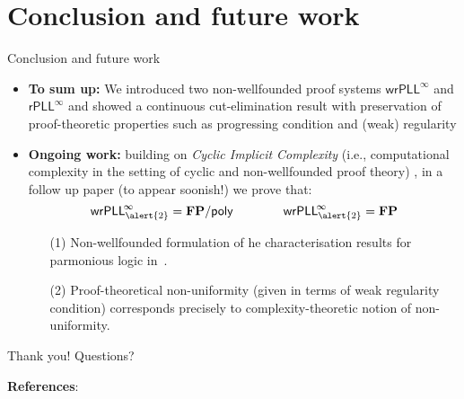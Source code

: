 \documentclass[10pt]{beamer}
\theoremstyle{definition}
\theoremstyle{plain}
\newcommand{\red}[1]{{\color{red}#1}}
\renewcommand{\red}{\alert}
\newcommand{\fptime}{\mathbf{FP}}
\newcommand{\fppoly}{\fptime/\mathsf{poly}}
\newcommand{\pll}{\mathsf{PLL}}
\newcommand{\nwpll}{\pll^{\!\infty}}
\newcommand{\nupll}{\mathsf{wr}\nwpll}
\newcommand{\cpll}{\mathsf{r}\nwpll}
\begin{document}
\section{Conclusion and future work}
\begin{frame}
	\tableofcontents[currentsection]
\end{frame}
	
	\begin{frame}{Conclusion and future work}
\begin{itemize}
	\item \textbf{To sum up:} We introduced two non-wellfounded proof systems $\nupll$ and $\cpll$ and showed a continuous cut-elimination result with preservation of proof-theoretic properties such as progressing condition and (weak) regularity
	\bigskip\bigskip\pause 
	\item \textbf{Ongoing work:} building on \emph{Cyclic Implicit Complexity} (i.e., computational complexity in the setting of cyclic and non-wellfounded proof theory) \cite{CurziDas1,CurziDas2}, in a follow up paper   (to appear soonish!)  we prove that:
	\[
	\nupll_{\red{2}}= \fppoly \qquad \qquad 	\nupll_{\red{2}}=\fptime
	\]
	\begin{itemize}
		\item[(1)]  Non-wellfounded formulation of he characterisation results for parmonious logic in~\cite{MazzaT15}.\medskip
		\item[(2)] Proof-theoretical non-uniformity (given in terms of weak regularity condition) corresponds precisely to complexity-theoretic notion of non-uniformity.
	\end{itemize}
	
\end{itemize}
	\end{frame}
	
		\begin{frame}
		\begin{center}
			\Large{{Thank you!  Questions?}}
		\end{center}
		\bigskip
		\textbf{References}:
		\medskip
		\tiny
		
		
	\end{frame}
	
	
	


	\appendix
	
\end{document}

